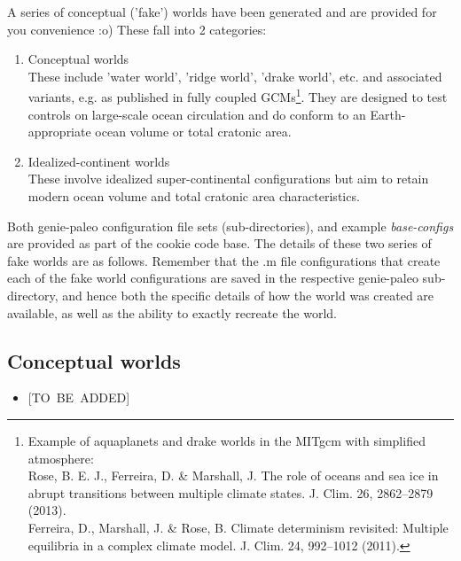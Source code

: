A series of conceptual ('fake') worlds have been generated and are provided for you convenience :o) These fall into 2 categories:

\begin{enumerate}[noitemsep]
\vspace{1mm}
\item Conceptual worlds
\\These include 'water world', 'ridge world', 'drake world', etc. and associated variants, e.g. as published in fully coupled GCMs\footnote{Example of aquaplanets and drake worlds in the MITgcm with simplified atmosphere:
\\Rose, B. E. J., Ferreira, D. \& Marshall, J. The role of oceans and sea ice in abrupt transitions between multiple climate states. J. Clim. 26, 2862–2879 (2013).
\\Ferreira, D., Marshall, J. \& Rose, B. Climate determinism revisited: Multiple equilibria in a complex climate model. J. Clim. 24, 992–1012 (2011).}. They are designed to test controls on large-scale ocean circulation and do conform to an Earth-appropriate ocean volume or total cratonic area.
\vspace{1mm}
\item Idealized-continent worlds
\\These involve idealized super-continental configurations but aim to retain modern ocean volume and total cratonic area characteristics.
\end{enumerate}
\vspace{1mm}

Both \textsf{\footnotesize genie-paleo} configuration file sets (sub-directories), and example \textit{base-configs} are provided as part of the cookie code base. The details of these two series of fake worlds are as follows. Remember that the \textsf{\footnotesize .m} file configurations that create each of the fake world configurations are saved in the respective \textsf{\footnotesize genie-paleo} sub-directory, and hence both the specific details of how the world was created are available, as well as the ability to exactly recreate the world.

%
\subsection{Conceptual worlds}

\small\begin{itemize}[noitemsep]
\vspace{1mm}
\item \textsf{\footnotesize } [TO\ BE\ ADDED]
\end{itemize}\normalsize
\vspace{1mm}

